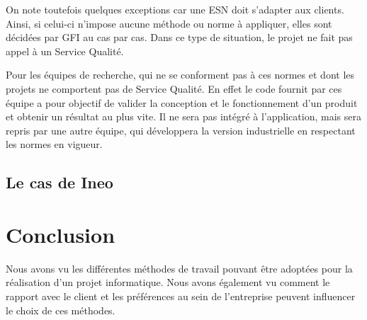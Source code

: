 On note toutefois quelques exceptions car une \gls{ESN} doit s'adapter aux clients. Ainsi, si celui-ci n'impose aucune méthode ou norme à appliquer, elles sont décidées par GFI au cas par cas. Dans ce type de situation, le projet ne fait pas appel à un Service Qualité.

Pour les équipes de recherche, qui ne se conforment pas à ces normes et dont les projets ne comportent pas de Service Qualité. En effet le code fournit par ces équipe a pour objectif de valider la conception et le fonctionnement d'un produit et obtenir un résultat au plus vite. Il ne sera pas intégré à l'application, mais sera repris par une autre équipe, qui développera la version industrielle en respectant les normes en vigueur.

\subsection{Le cas de Ineo}

\section{Conclusion}

Nous avons vu les différentes méthodes de travail pouvant être adoptées pour la réalisation d'un projet informatique. Nous avons également vu comment le rapport avec le client et les préférences au sein de l'entreprise peuvent influencer le choix de ces méthodes.
